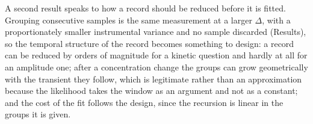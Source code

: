 A second result speaks to how a record should be reduced before it is fitted. Grouping consecutive
samples is the same measurement at a larger $\Delta$, with a proportionately smaller instrumental
variance and no sample discarded (Results), so the temporal structure of the record becomes
something to design: a record can be reduced by orders of magnitude for a kinetic question and
hardly at all for an amplitude one; after a concentration change the groups can grow geometrically
with the transient they follow, which is legitimate rather than an approximation because the
likelihood takes the window as an argument and not as a constant; and the cost of the fit follows
the design, since the recursion is linear in the groups it is given.


